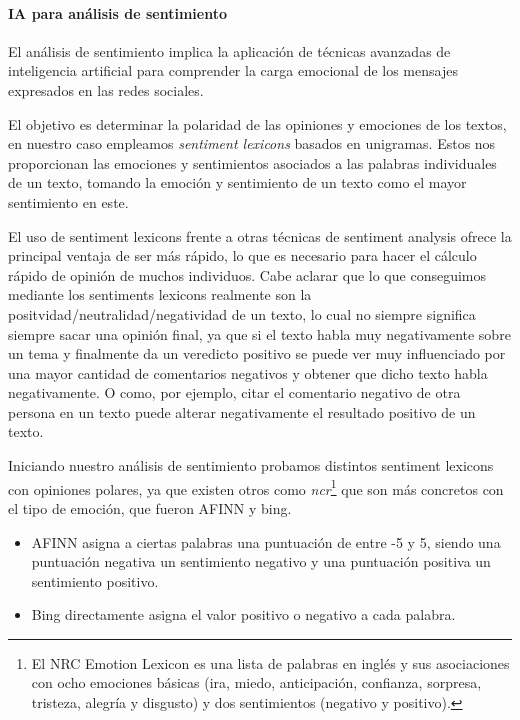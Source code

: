 \documentclass[
  letterpaper,
  DIV=11,
  numbers=noendperiod]{scrartcl}
\let\oldparagraph\paragraph
\renewcommand{\paragraph}[1]{\oldparagraph{#1}\mbox{}}
\begin{document}
\paragraph{IA para análisis de
sentimiento}\label{ia-para-anuxe1lisis-de-sentimiento}

El análisis de sentimiento implica la aplicación de técnicas avanzadas
de inteligencia artificial para comprender la carga emocional de los
mensajes expresados en las redes sociales.

El objetivo es determinar la polaridad de las opiniones y emociones de
los textos, en nuestro caso empleamos \emph{sentiment lexicons} basados
en unigramas. Estos nos proporcionan las emociones y sentimientos
asociados a las palabras individuales de un texto, tomando la emoción y
sentimiento de un texto como el mayor sentimiento en este.

El uso de sentiment lexicons frente a otras técnicas de sentiment
analysis ofrece la principal ventaja de ser más rápido, lo que es
necesario para hacer el cálculo rápido de opinión de muchos individuos.
Cabe aclarar que lo que conseguimos mediante los sentiments lexicons
realmente son la positvidad/neutralidad/negatividad de un texto, lo cual
no siempre significa siempre sacar una opinión final, ya que si el texto
habla muy negativamente sobre un tema y finalmente da un veredicto
positivo se puede ver muy influenciado por una mayor cantidad de
comentarios negativos y obtener que dicho texto habla negativamente. O
como, por ejemplo, citar el comentario negativo de otra persona en un
texto puede alterar negativamente el resultado positivo de un texto.

Iniciando nuestro análisis de sentimiento probamos distintos sentiment
lexicons con opiniones polares, ya que existen otros como
\emph{ncr}\footnote{El NRC Emotion Lexicon es una lista de palabras en inglés y sus asociaciones con ocho emociones básicas (ira, miedo, anticipación, confianza, sorpresa, tristeza, alegría y disgusto) y dos sentimientos (negativo y positivo).}
que son más concretos con el tipo de emoción, que fueron AFINN y bing.

\begin{itemize}
\item
  AFINN asigna a ciertas palabras una puntuación de entre -5 y 5, siendo
  una puntuación negativa un sentimiento negativo y una puntuación
  positiva un sentimiento positivo.
\item
  Bing directamente asigna el valor positivo o negativo a cada palabra.
\end{itemize}
\end{document}
